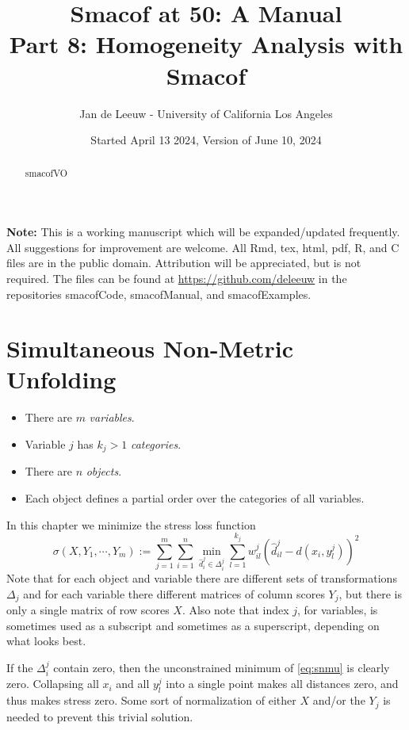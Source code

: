 \documentclass[
  12pt,
]{article}
\title{Smacof at 50: A Manual\\
Part 8: Homogeneity Analysis with Smacof}
\author{Jan de Leeuw - University of California Los Angeles}
\date{Started April 13 2024, Version of June 10, 2024}
\providecommand{\tightlist}{%
  \setlength{\itemsep}{0pt}\setlength{\parskip}{0pt}}
\begin{document}
\maketitle
\begin{abstract}
smacofVO
\end{abstract}

{
\setcounter{tocdepth}{3}
\tableofcontents
}
\textbf{Note:} This is a working manuscript which will be expanded/updated
frequently. All suggestions for improvement are welcome. All Rmd, tex,
html, pdf, R, and C files are in the public domain. Attribution will be
appreciated, but is not required. The files can be found at
\url{https://github.com/deleeuw} in the repositories smacofCode, smacofManual,
and smacofExamples.

\section{Simultaneous Non-Metric Unfolding}\label{simultaneous-non-metric-unfolding}

\begin{itemize}
\tightlist
\item
  There are \(m\) \emph{variables}.
\item
  Variable \(j\) has \(k_j>1\) \emph{categories}.
\item
  There are \(n\) \emph{objects}.
\item
  Each object defines a partial order over the categories of all variables.
\end{itemize}

In this chapter we minimize the stress loss function
\begin{equation}
\sigma(X,Y_1,\cdots,Y_m):=\sum_{j=1}^m\sum_{i=1}^n\min_{\hat d_i^j\in\Delta_i^j}\sum_{l=1}^{k_j}w_{il}^j(\hat d_{il}^j-d(x_i,y_l^j))^2
\label{eq:snmu}
\end{equation}
Note that for each object and variable there are different sets of transformations \(\Delta_j\)
and for each variable there different matrices of column scores \(Y_j\), but there is only a single matrix of row scores \(X\). Also note that index \(j\), for variables,
is sometimes used as a subscript and sometimes as a superscript, depending on what
looks best.

If the \(\Delta_i^j\) contain zero, then the unconstrained minimum of \eqref{eq:snmu}
is clearly zero. Collapsing all \(x_i\) and all \(y_l^j\) into a single point makes all distances zero, and thus makes stress zero. Some sort of normalization of either \(X\) and/or the \(Y_j\) is needed to prevent this trivial solution.
\end{document}
